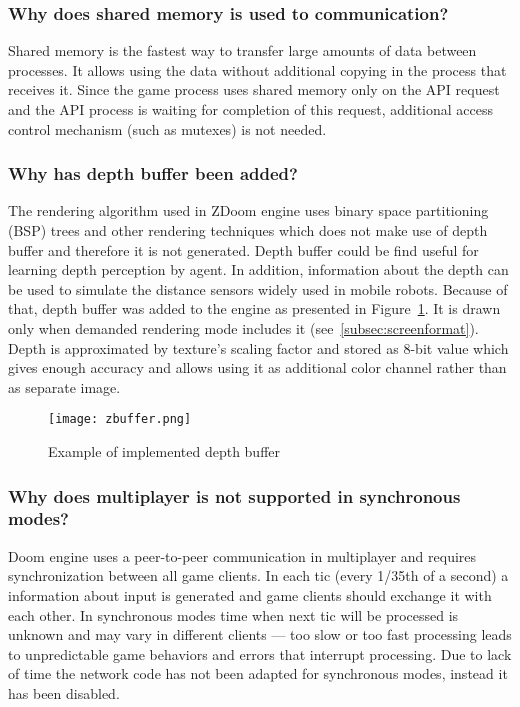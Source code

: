 \subsubsection{Why does shared memory is used to communication?}

Shared memory is the fastest way to transfer large amounts of data between processes. It allows using the data without additional copying in the process that receives it. 
Since the game process uses shared memory only on the API request and the API process is waiting for completion of this request, additional access control mechanism (such as mutexes) is not needed.

\subsubsection{Why has depth buffer been added?}

The rendering algorithm used in ZDoom engine uses binary space partitioning (BSP) trees and other rendering techniques which does not make use of depth buffer and therefore it is not generated.
Depth buffer could be find useful for learning depth perception by agent.
In addition, information about the depth can be used to simulate the distance sensors widely used in mobile robots.  
Because of that, depth buffer was added to the engine as presented in Figure~\ref{fig:zbuffer}.
It is drawn only when demanded rendering mode includes it (see~\ref{subsec:screenformat}).
Depth is approximated by texture's scaling factor and stored as 8-bit value which gives enough accuracy and allows using it as additional color channel rather than as separate image.

\begin{figure}
\centering
\texttt{[image: zbuffer.png]}
\caption{Example of implemented depth buffer}
\label{fig:zbuffer}
\end{figure}

\subsubsection{Why does multiplayer is not supported in synchronous modes?}\label{sec:architecture_solution_multi}

Doom engine uses a peer-to-peer communication in multiplayer and requires synchronization between all game clients. In each tic (every 1/35th of a second) a information about input is generated and game clients should exchange it with each other. 
In synchronous modes time when next tic will be processed is unknown and may vary in different clients --- too slow or too fast processing leads to unpredictable game behaviors and errors that interrupt processing. Due to lack of time the network code has not been adapted for synchronous modes, instead it has been disabled.

